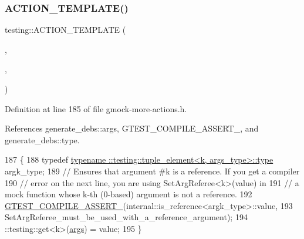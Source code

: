 \subsubsection{\texorpdfstring{A\+C\+T\+I\+O\+N\+\_\+\+T\+E\+M\+P\+L\+A\+T\+E()}{ACTION\_TEMPLATE()}\hspace{0.1cm}{\footnotesize\ttfamily [4/28]}}
{\footnotesize\ttfamily testing\+::\+A\+C\+T\+I\+O\+N\+\_\+\+T\+E\+M\+P\+L\+A\+TE (\begin{DoxyParamCaption}\item[{Set\+Arg\+Referee}]{,  }\item[{H\+A\+S\+\_\+1\+\_\+\+T\+E\+M\+P\+L\+A\+T\+E\+\_\+\+P\+A\+R\+A\+MS(int, k)}]{,  }\item[{A\+N\+D\+\_\+1\+\_\+\+V\+A\+L\+U\+E\+\_\+\+P\+A\+R\+A\+MS(value)}]{ }\end{DoxyParamCaption})}



Definition at line 185 of file gmock-\/more-\/actions.\+h.



References generate\+\_\+debs\+::args, G\+T\+E\+S\+T\+\_\+\+C\+O\+M\+P\+I\+L\+E\+\_\+\+A\+S\+S\+E\+R\+T\+\_\+, and generate\+\_\+debs\+::type.


\begin{DoxyCode}
187                                            \{
188   \textcolor{keyword}{typedef} \hyperlink{namespacegenerate__debs_a50bc9a7ecac9584553e089a448bcde58}{typename ::testing::tuple\_element<k, args\_type>::type}
       argk\_type;
189   \textcolor{comment}{// Ensures that argument #k is a reference.  If you get a compiler}
190   \textcolor{comment}{// error on the next line, you are using SetArgReferee<k>(value) in}
191   \textcolor{comment}{// a mock function whose k-th (0-based) argument is not a reference.}
192   \hyperlink{gtest-port_8h_ae1f37dc71d5daa6fb49ca1b6047d4a8c}{GTEST\_COMPILE\_ASSERT\_}(internal::is\_reference<argk\_type>::value,
193                         SetArgReferee\_must\_be\_used\_with\_a\_reference\_argument);
194   ::testing::get<k>(\hyperlink{namespacegenerate__debs_a75f9143e38df82d83b2e8a6f99cae02c}{args}) = value;
195 \}
\end{DoxyCode}
\mbox{\label{namespacetesting_a2b0f090219db3bb0630d5ce6f7d911d8}} 

